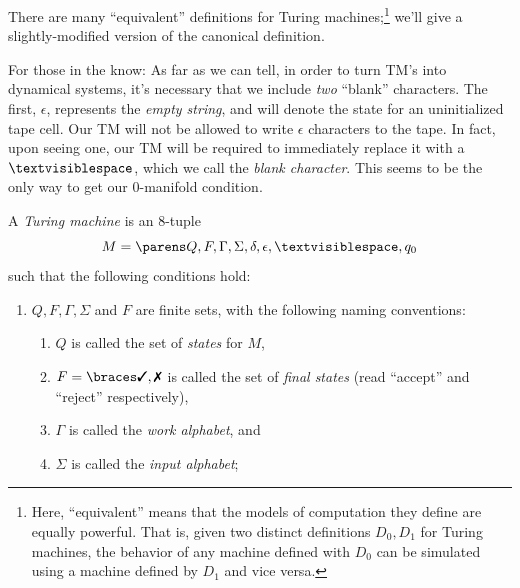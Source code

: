 \documentclass{fkpaper}
\newcommand{\blank}{\textvisiblespace}
\begin{document}
\begin{multicols}{2}
There are many ``equivalent'' definitions for Turing
machines;\footnote{Here, ``equivalent'' means that the models of
  computation they define are equally powerful. That is, given two
  distinct definitions $D_0, D_1$ for Turing machines, the behavior of
  any machine defined with $D_0$ can be simulated using a machine
  defined by $D_1$ and vice versa.} we'll give a slightly-modified
version of the canonical definition.
\begin{remark}
  For those in the know: As far as we can tell, in order to turn TM's
  into dynamical systems, it's necessary that we include \emph{two}
  ``blank'' characters. The first, $\epsilon$, represents the
  \emph{empty string}, and will denote the state for an uninitialized
  tape cell. Our TM will not be allowed to write $\epsilon$ characters
  to the tape. In fact, upon seeing one, our TM will be required to
  immediately replace it with a $\blank$, which we call the
  \emph{blank character}. This seems to be the only way to get our
  $0$-manifold condition.
\end{remark}
\begin{definition}
  A \emph{Turing machine} is an 8-tuple
  \[
    M = \pn{Q, F, \Gamma, \Sigma, \delta, \epsilon, \blank, q_0}
  \]
  such that the following conditions hold:
  \begin{enumerate}[label=\arabic*)]
    \item $Q, F, \Gamma, \Sigma$ and $F$ are finite sets, with the
      following naming conventions:
      \begin{enumerate}[label=\roman*)]
        \item $Q$ is called the set of \emph{states} for $M$,
        \item $F = \set{\cmark, \xmark}$ is called the set of
          \emph{final states} (read ``accept'' and ``reject''
          respectively),
        \item $\Gamma$ is called the \emph{work alphabet}, and
        \item $\Sigma$ is called the \emph{input alphabet};
      \end{enumerate}

\end{enumerate}
\end{definition}
\end{multicols}
\end{document}
